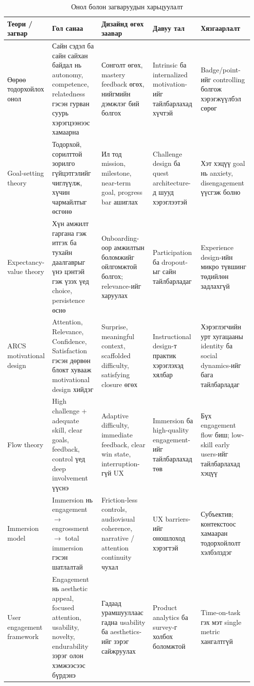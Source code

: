 \begin{sloppy}
\begin{table}[H]
\centering
\caption{Онол болон загваруудын харьцуулалт}
\label{tab:theory-comparison}
\small
\begin{tabular}{|p{2.5cm}|p{3cm}|p{3cm}|p{2.5cm}|p{2cm}|}
\hline
\textbf{Теори / загвар} & \textbf{Гол санаа} & \textbf{Дизайнд өгөх заавар} & \textbf{Давуу тал} & \textbf{Хязгаарлалт} \\ \hline
Өөрөө тодорхойлох онол & Сайн сэдэл ба сайн сайхан байдал нь autonomy, competence, relatedness гэсэн гурван суурь хэрэгцээнээс хамаарна & Сонголт өгөх, mastery feedback өгөх, нийгмийн дэмжлэг бий болгох & Intrinsic ба internalized motivation-ийг тайлбарлахад хүчтэй & Badge/point-ийг controlling болгож хэрэгжүүлбэл сөрөг \\ \hline
Goal-setting theory & Тодорхой, сорилттой зорилго гүйцэтгэлийг чиглүүлж, хүчин чармайлтыг өсгөнө & Ил тод mission, milestone, near-term goal, progress bar ашиглах & Challenge design ба quest architecture-д шууд хэрэглээтэй & Хэт хэцүү goal нь anxiety, disengagement үүсгэж болно \\ \hline
Expectancy-value theory & Хүн амжилт гаргана гэж итгэх ба тухайн даалгаврыг үнэ цэнтэй гэж үзэх үед choice, persistence өснө & Onboarding-оор амжилтын боломжийг ойлгомжтой болгох; relevance-ийг харуулах & Participation ба dropout-ыг сайн тайлбарладаг & Experience design-ийн микро түвшинг төдийлөн задлахгүй \\ \hline
ARCS motivational design & Attention, Relevance, Confidence, Satisfaction гэсэн дөрвөн блокт хувааж motivational design хийдэг & Surprise, meaningful context, scaffolded difficulty, satisfying closure өгөх & Instructional design-т практик хэрэглэхэд хялбар & Хэрэглэгчийн урт хугацааны identity ба social dynamics-ийг бага тайлбарладаг \\ \hline
Flow theory & High challenge + adequate skill, clear goals, feedback, control үед deep involvement үүснэ & Adaptive difficulty, immediate feedback, clear win state, interruption-гүй UX & Immersion ба high-quality engagement-ийг тайлбарлахад төв & Бүх engagement flow биш; low-skill early users-ийг тайлбарлахад хэцүү \\ \hline
Immersion model & Immersion нь engagement $\to$ engrossment $\to$ total immersion гэсэн шатлалтай & Friction-less controls, audiovisual coherence, narrative / attention continuity чухал & UX barriers-ийг оношлоход хэрэгтэй & Субъектив; контекстоос хамааран тодорхойлолт хэлбэлздэг \\ \hline
User engagement framework & Engagement нь aesthetic appeal, focused attention, usability, novelty, endurability зэрэг олон хэмжээсээс бүрдэнэ & Гадаад урамшууллаас гадна usability ба aesthetics-ийг зэрэг сайжруулах & Product analytics ба survey-г холбох боломжтой & Time-on-task гэх мэт single metric хангалтгүй \\ \hline

\end{tabular}
\end{table}
\end{sloppy}
